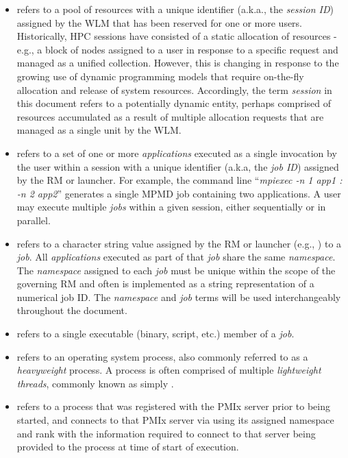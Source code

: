 \begin{itemize}
\item {} refers to a pool of resources with a unique identifier (a.k.a., the \emph{session ID}) assigned by the \ac{WLM} that has been reserved for one or more users. Historically, \ac{HPC} sessions have consisted of a static allocation of resources - e.g., a block of nodes assigned to a user in response to a specific request and managed as a unified collection. However, this is changing in response to the growing use of dynamic programming models that require on-the-fly allocation and release of system resources. Accordingly, the term \emph{session} in this document refers to a potentially dynamic entity, perhaps comprised of resources accumulated as a result of multiple allocation requests that are managed as a single unit by the \ac{WLM}.

\item {} refers to a set of one or more \emph{applications} executed as a single invocation by the user within a session with a unique identifier (a.k.a, the \emph{job ID}) assigned by the \ac{RM} or launcher. For example, the command line ``\textit{mpiexec -n 1 app1 : -n 2 app2}'' generates a single \ac{MPMD} job containing two applications. A user may execute multiple \emph{jobs} within a given session, either sequentially or in parallel.

\item {} refers to a character string value assigned by the \ac{RM} or launcher (e.g., ) to a \textit{job}. All \textit{applications} executed as part of that \textit{job} share the same \emph{namespace}. The \emph{namespace} assigned to each \emph{job} must be unique within the scope of the governing \ac{RM} and often is implemented as a string representation of a numerical job ID. The \emph{namespace} and \emph{job} terms will be used interchangeably throughout the document.

\item {} refers to a single executable (binary, script, etc.) member of a \emph{job}.

\item {} refers to an operating system process, also commonly referred to as a \emph{heavyweight} process. A process is often comprised of multiple \emph{lightweight threads}, commonly known as simply .

\item {} refers to a process that was registered with the \ac{PMIx} server prior to being started, and connects to that \ac{PMIx} server via  using its assigned namespace and rank with the information required to connect to that server being provided to the process at time of start of execution.


\end{itemize}

